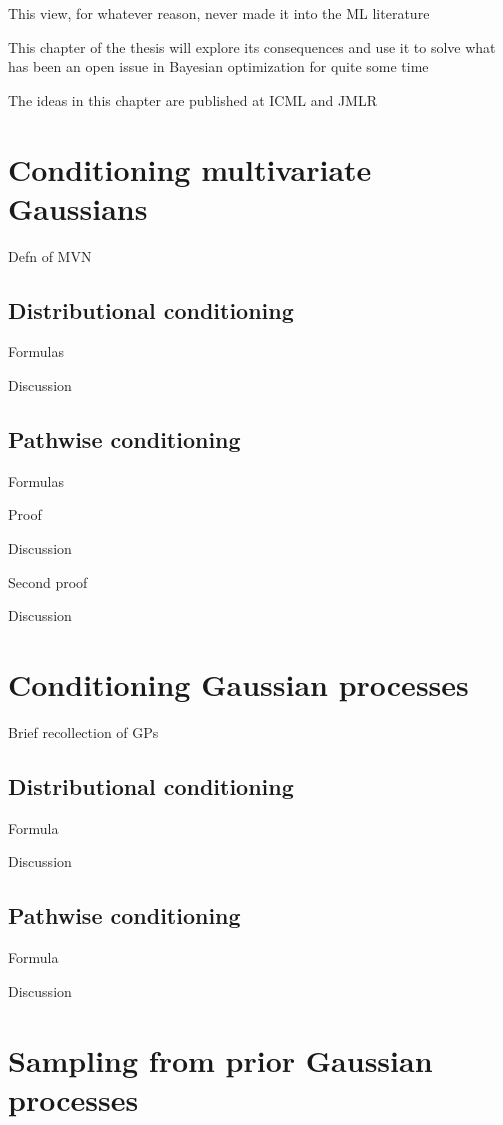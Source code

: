 \documentclass[11pt]{book}
\begin{document}
This view, for whatever reason, never made it into the ML literature

This chapter of the thesis will explore its consequences and use it to solve what has been an open issue in Bayesian optimization for quite some time

The ideas in this chapter are published at ICML and JMLR

\section{Conditioning multivariate Gaussians}

Defn of MVN

\subsection{Distributional conditioning}

Formulas

Discussion

\subsection{Pathwise conditioning}

Formulas

Proof

Discussion

Second proof

Discussion

\section{Conditioning Gaussian processes}

Brief recollection of GPs 

\subsection{Distributional conditioning}

Formula

Discussion

\subsection{Pathwise conditioning}

Formula

Discussion

\section{Sampling from prior Gaussian processes}
\end{document}

